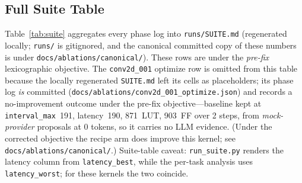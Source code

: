 \subsection{Full Suite Table}\label{app:suite}

Table~\ref{tab:suite} aggregates every phase log into \texttt{runs/SUITE.md}
(regenerated locally; \texttt{runs/} is gitignored, and the canonical committed copy
of these numbers is under \texttt{docs/ablations/canonical/}). These rows are under
the \emph{pre-fix} lexicographic objective. The \texttt{conv2d\_001} optimize row is
omitted from this table because the locally regenerated \texttt{SUITE.md} left its
cells as placeholders; its phase log \emph{is} committed
(\texttt{docs/ablations/conv2d\_001\_optimize.json}) and records a no-improvement
outcome under the pre-fix objective---baseline kept at \texttt{interval\_max}~191,
latency~190, 871~LUT, 903~FF over 2 steps, from \emph{mock-provider} proposals at
0 tokens, so it carries no LLM evidence. (Under the corrected objective the
recipe arm does improve this kernel; see \texttt{docs/ablations/canonical/}.)
Suite-table caveat: \texttt{run\_suite.py} renders
the latency column from \texttt{latency\_best}, while the per-task analysis uses
\texttt{latency\_worst}; for these kernels the two coincide.


